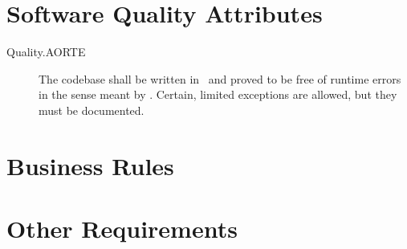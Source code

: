 \section{Software Quality Attributes}

\begin{description}
\item[Quality.AORTE] The codebase shall be written in \SPARK\ and proved to be free of runtime
  errors in the sense meant by \SPARK. Certain, limited exceptions are allowed, but they must be
  documented.
\end{description}

\section{Business Rules}

\section{Other Requirements}
